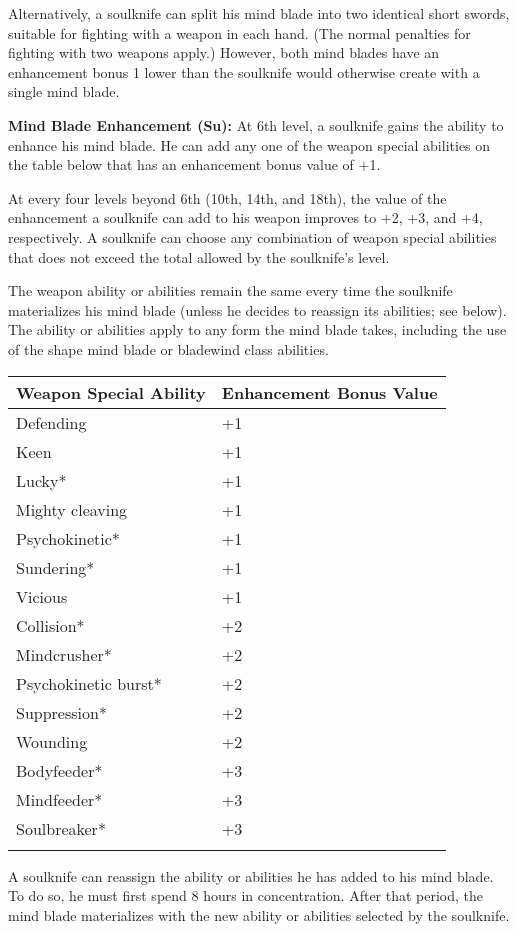 \documentclass{article}
\begin{document}
Alternatively, a soulknife can split his mind blade into two identical short swords, 
suitable for fighting with a weapon in each hand. (The normal penalties for fighting 
with two weapons apply.) However, both mind blades have an enhancement bonus 1 
lower than the soulknife would otherwise create with a single mind blade.

\textbf{Mind Blade Enhancement (Su): }At 6th level, a soulknife gains the ability 
to enhance his mind blade. He can add any one of the weapon special abilities on 
the table below that has an enhancement bonus value of +1.

At every four levels beyond 6th (10th, 14th, and 18th), the value of the enhancement 
a soulknife can add to his weapon improves to +2, +3, and +4, respectively. A soulknife 
can choose any combination of weapon special abilities that does not exceed the 
total allowed by the soulknife's level.

The weapon ability or abilities remain the same every time the soulknife materializes 
his mind blade (unless he decides to reassign its abilities; see below). The ability 
or abilities apply to any form the mind blade takes, including the use of the shape 
mind blade or bladewind class abilities.

\vspace{12pt}
\begin{tabular}{|>{\raggedright}p{99pt}|>{\raggedright}p{114pt}|}
\hline
W\textbf{eapon Special Ability} & E\textbf{nhancement Bonus Value}\tabularnewline
\hline
Defending & +1\tabularnewline
\hline
Keen & +1\tabularnewline
\hline
Lucky* & +1\tabularnewline
\hline
Mighty cleaving & +1\tabularnewline
\hline
Psychokinetic* & +1\tabularnewline
\hline
Sundering* & +1\tabularnewline
\hline
Vicious & +1\tabularnewline
\hline
Collision* & +2\tabularnewline
\hline
Mindcrusher* & +2\tabularnewline
\hline
Psychokinetic burst* & +2\tabularnewline
\hline
Suppression* & +2\tabularnewline
\hline
Wounding & +2\tabularnewline
\hline
Bodyfeeder* & +3\tabularnewline
\hline
Mindfeeder* & +3\tabularnewline
\hline
Soulbreaker* & +3\tabularnewline
\hline
\multicolumn{2}{|p{213pt}|}{*New special abilities}\tabularnewline
\hline
\end{tabular}

\vspace{12pt}
A soulknife can reassign the ability or abilities he has added to his mind blade. 
To do so, he must first spend 8 hours in concentration. After that period, the 
mind blade materializes with the new ability or abilities selected by the soulknife.
\end{document}
